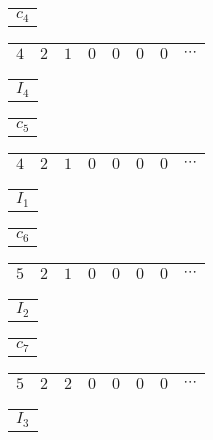\documentclass[12pt]{article}
\begin{document}
\vspace{-0.75cm}
\begin{center}
\begin{tabular}{ p{0.5cm} }
$c_4$
\end{tabular}
\begin{tabular}{|c|c|c|c|c|c|c|c}
\hline
$4$ & $2$ & $1$ & $0$ & $0$ & $0$ & $0$ & $\cdots$ \\
\hline
\end{tabular}
\begin{tabular}{ p{0.5cm} }
$I_4$
\end{tabular}
\end{center}
\vspace{-0.75cm}
\begin{center}
\begin{tabular}{ p{0.5cm} }
$c_5$
\end{tabular}
\begin{tabular}{|c|c|c|c|c|c|c|c}
\hline
$4$ & $2$ & $1$ & $0$ & $0$ & $0$ & $0$ & $\cdots$ \\
\hline
\end{tabular}
\begin{tabular}{ p{0.5cm} }
$I_1$
\end{tabular}
\end{center}
\vspace{-0.75cm}
\begin{center}
\begin{tabular}{ p{0.5cm} }
$c_6$
\end{tabular}
\begin{tabular}{|c|c|c|c|c|c|c|c}
\hline
$5$ & $2$ & $1$ & $0$ & $0$ & $0$ & $0$ & $\cdots$ \\
\hline
\end{tabular}
\begin{tabular}{ p{0.5cm} }
$I_2$
\end{tabular}
\end{center}
\vspace{-0.75cm}
\begin{center}
\begin{tabular}{ p{0.5cm} }
$c_7$
\end{tabular}
\begin{tabular}{|c|c|c|c|c|c|c|c}
\hline
$5$ & $2$ & $2$ & $0$ & $0$ & $0$ & $0$ & $\cdots$ \\
\hline
\end{tabular}
\begin{tabular}{ p{0.5cm} }
$I_3$
\end{tabular}
\end{center}
\end{document}
